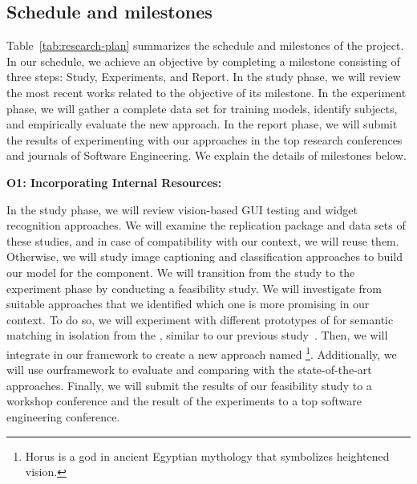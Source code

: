 \subsection{Schedule and milestones}



Table~\ref{tab:research-plan} summarizes the schedule and milestones of the \project project.
In our schedule, we achieve an objective by completing a milestone  consisting of three steps: Study, Experiments, and Report. 
 In the study phase, we will review the most recent works related to the objective of its milestone.
In the experiment phase, we will gather a complete data set for training models,  identify subjects, and empirically evaluate the new approach. 
In the report phase, we will submit the results of experimenting with our approaches in  the top research conferences and journals of Software Engineering.
We explain the details of milestones below.

\smallskip
\noindent
\textbf{O1: Incorporating Internal Resources:}  

\noindent
In the study phase, we will review vision-based GUI testing  and widget recognition approaches. 
We will examine the replication package and data sets of these studies, and in case of compatibility with our context, we will reuse them. 
Otherwise, we will study image captioning and classification approaches to build our model for the \imagelabeler component.
%
We will transition from the study to the experiment phase by conducting a feasibility study. 
We will investigate from suitable approaches that we identified which one is more promising in our context.
To do so, we will experiment with different prototypes of \imagelabeler for semantic matching in isolation from the \testreuse,  similar to our previous study~\cite{mariani:SemFinder:ISSTA:2021}. 
Then, we will integrate \imagelabeler in our \tme framework to create a new \testreuse approach named \visiontool\footnote{Horus is a god in ancient Egyptian mythology that symbolizes heightened vision.}.
Additionally, we will use our\tme framework to evaluate \visiontool and comparing with the state-of-the-art \testreuse approaches.
Finally, we will submit the results of our  feasibility study to a workshop conference and the result of the \testreuse experiments to a top software engineering conference. 

